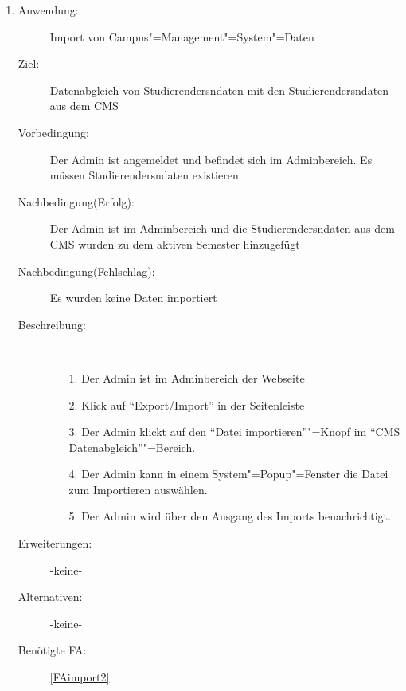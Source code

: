 \documentclass[parskip=full]{scrartcl}
\newcommand{\swtLabel}[1]{\textbf{/#1\arabic*0/}}
\begin{document}
\begin{enumerate} [label=\swtLabel{A}]
      \item \label{UCadminImport2}
    \begin{description}
    \item[Anwendung:] Import von Campus"=Management"=System"=Daten %
    \item[Ziel:] Datenabgleich von \glspl{Studierender}ndaten mit den \glspl{Studierender}ndaten aus dem \gls{CMS}
    \item[Vorbedingung:] Der \gls{Admin} ist angemeldet und befindet sich im
    \gls{Admin}bereich. Es müssen \glspl{Studierender}ndaten existieren.
    \item[Nachbedingung(Erfolg):] Der \gls{Admin} ist im \gls{Admin}bereich und die \glspl{Studierender}ndaten aus dem \gls{CMS} wurden zu dem aktiven Semester hinzugefügt
    \item[Nachbedingung(Fehlschlag):] Es wurden keine Daten importiert
    \item[Beschreibung:]~
    \begin{enumerate}
      \item[1.] Der \gls{Admin} ist im \gls{Admin}bereich der Webseite
      \item[2.] Klick auf \enquote{Export/Import}
      in der Seitenleiste
       \item[3.] Der \gls{Admin} klickt auf den \enquote{Datei importieren}"=Knopf im \enquote{CMS Datenabgleich}"=Bereich.
       \item[4.] Der \gls{Admin} kann in einem System"=Popup"=Fenster die Datei zum Importieren auswählen.
      \item[5.] Der \gls{Admin} wird über den Ausgang des Imports benachrichtigt.
    \end{enumerate}
    \item[Erweiterungen:] -keine-
    \item[Alternativen:] -keine-
    \item[Benötigte FA:] \ref{FAimport2}
  \end{description}
  

\end{enumerate}
\end{document}
